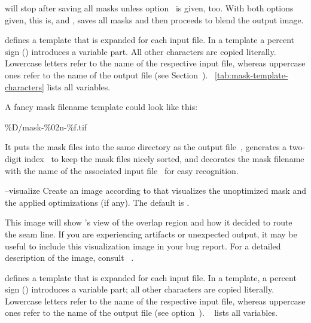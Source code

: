 \begin{codelist}
  \begin{sloppypar}
    \App{} will stop after saving all masks unless
    option~ is given, too.  With both options given,
    this is,  and , \App{} saves all masks and then
    proceeds to blend the output image.
  \end{sloppypar}

  \begin{geeknote}
     defines a template that is expanded for each input file.  In a
    template a percent sign (\sample{\%}) introduces a variable part.  All other characters are
    copied literally.  Lowercase letters refer to the name of the respective input file, whereas
    uppercase ones refer to the name of the output file (see
    Section~).  \tableName~\ref{tab:mask-template-characters} lists
    all variables.

    A fancy mask filename template could look like this:

    \begin{literal}
      \%D/mask-\%02n-\%f.tif
    \end{literal}

    It puts the mask files into the same directory as the output file~, generates a
    two-digit index~ to keep the mask files nicely sorted, and decorates the mask
    filename with the name of the associated input file~ for easy recognition.
  \end{geeknote}


  \label{opt:visualize}%
\item[--visualize\optional{=\metavar{VISUALIZE-TEMPLATE}}]\itemend
  Create an image according to  that visualizes the unoptimized mask
  and the applied optimizations (if any).  The default is
  \mbox{}.

  This image will show \App{}'s view of the overlap region and how it decided to route the seam
  line.  If you are experiencing artifacts or unexpected output, it may be useful to include
  this visualization image in your bug report.  For a detailed description of the image, consult
  \chapterName~.

  \begin{geeknote}
     defines a template that is expanded for each input file.  In a
    template, a percent sign (\sample{\%}) introduces a variable part; all other characters are
    copied literally.  Lowercase letters refer to the name of the respective input file, whereas
    uppercase ones refer to the name of the output file (see
    option~).
    \tableName~ lists all variables.
  \end{geeknote}
\end{codelist}







